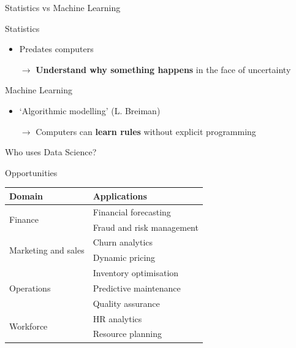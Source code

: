 \begin{frame}{Statistics vs Machine Learning}
    \begin{block}{Statistics}
        \begin{itemize}
            \item Predates computers
            \item[$\rightarrow$] \textbf{Understand why something happens} in
                                 the face of uncertainty
        \end{itemize}
    \end{block}
    \vfill\pause
    \begin{block}{Machine Learning}
        \begin{itemize}
            \item `Algorithmic modelling' (L. Breiman)
            \item[$\rightarrow$] Computers can \textbf{learn rules} without
                                 explicit programming
        \end{itemize}
    \end{block}
\end{frame}

\begin{frame}
    \begin{center}
        \LARGE%
        Who uses Data Science?
    \end{center}
\end{frame}

\begin{frame}{Opportunities}
    \begin{center}
        \begin{tabular}{ll}
            \toprule
            \textbf{Domain}                      & \textbf{Applications} \\
            \midrule
            \multirow{2}{*}{Finance}             & Financial forecasting \\
                                                 & Fraud and risk management \\
            \midrule
            \multirow{2}{*}{Marketing and sales} & Churn analytics \\
                                                 & Dynamic pricing \\
            \midrule
            \multirow{3}{*}{Operations}          & Inventory optimisation \\
                                                 & Predictive maintenance \\
                                                 & Quality assurance \\
            \midrule
            \multirow{2}{*}{Workforce}           & HR analytics \\
                                                 & Resource planning \\
            \bottomrule
        \end{tabular}
    \end{center}
\end{frame}

